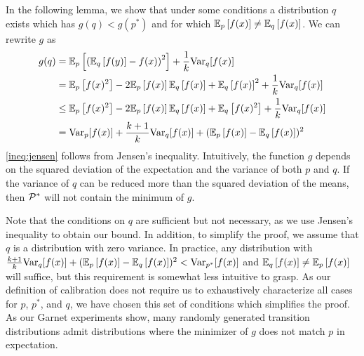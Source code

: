 In the following lemma, we show that under some conditions a distribution $q$ exists which has $g(q) < g(p^*)$ and for which $\EEX{p}{f(x)} \neq \EEX{q}{f(x)}$.
We can rewrite $g$ as
\begin{align}
    g(q) &=\EEX{p}{\left(\EEX{q}{f(y)} - f(x)\right)^2} + \frac{1}{k}\mathrm{Var}_q[f(x)] \\
    &= \EEX{p}{f(x)^2} - 2\EEX{p}{f(x)}\EEX{q}{f(x)} + \EEX{q}{f(x)}^2 + \frac{1}{k}\mathrm{Var}_q[f(x)]\\
    & \leq \EEX{p}{f(x)^2} - 2\EEX{p}{f(x)}\EEX{q}{f(x)} + \EEX{q}{f(x)^2}  + \frac{1}{k}\mathrm{Var}_q[f(x)]\label{ineq:jensen}\\
    & = \mathrm{Var}_p[f(x)] + \frac{k + 1}{k}\mathrm{Var}_q[f(x)] + (\EEX{p}{f(x)} - \EEX{q}{f(x)})^2
\end{align}
\autoref{ineq:jensen} follows from Jensen's inequality.
Intuitively, the function $g$ depends on the squared deviation of the expectation and the variance of both $p$ and $q$.
If the variance of $q$ can be reduced more than the squared deviation of the means, then $\P^*$ will not contain the minimum of $g$.

Note that the conditions on $q$ are sufficient but not necessary, as we use Jensen's inequality to obtain our bound.
In addition, to simplify the proof, we assume that $q$ is a distribution with zero variance.
In practice, any distribution with $\frac{k + 1}{k}\mathrm{Var}_q[f(x)] + (\EEX{p}{f(x)} - \EEX{q}{f(x)})^2 < \mathrm{Var}_{p^*}[f(x)]$ and $\EEX{q}{f(x)} \not = \EEX{p}{f(x)}$ will suffice, but this requirement is somewhat less intuitive to grasp.
As our definition of calibration does not require us to exhaustively characterize all cases for $p$, $p^*$, and $q$, we have chosen this set of conditions which simplifies the proof. 
As our Garnet experiments show, many randomly generated transition distributions admit distributions where the minimizer of $g$ does not match $p$ in expectation.

